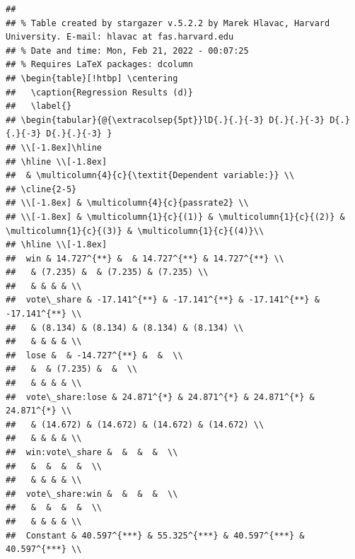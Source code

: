 \documentclass[
  12pt,
  landscape]{article}
\begin{document}
\begin{verbatim}
## 
## % Table created by stargazer v.5.2.2 by Marek Hlavac, Harvard University. E-mail: hlavac at fas.harvard.edu
## % Date and time: Mon, Feb 21, 2022 - 00:07:25
## % Requires LaTeX packages: dcolumn 
## \begin{table}[!htbp] \centering 
##   \caption{Regression Results (d)} 
##   \label{} 
## \begin{tabular}{@{\extracolsep{5pt}}lD{.}{.}{-3} D{.}{.}{-3} D{.}{.}{-3} D{.}{.}{-3} } 
## \\[-1.8ex]\hline 
## \hline \\[-1.8ex] 
##  & \multicolumn{4}{c}{\textit{Dependent variable:}} \\ 
## \cline{2-5} 
## \\[-1.8ex] & \multicolumn{4}{c}{passrate2} \\ 
## \\[-1.8ex] & \multicolumn{1}{c}{(1)} & \multicolumn{1}{c}{(2)} & \multicolumn{1}{c}{(3)} & \multicolumn{1}{c}{(4)}\\ 
## \hline \\[-1.8ex] 
##  win & 14.727^{**} &  & 14.727^{**} & 14.727^{**} \\ 
##   & (7.235) &  & (7.235) & (7.235) \\ 
##   & & & & \\ 
##  vote\_share & -17.141^{**} & -17.141^{**} & -17.141^{**} & -17.141^{**} \\ 
##   & (8.134) & (8.134) & (8.134) & (8.134) \\ 
##   & & & & \\ 
##  lose &  & -14.727^{**} &  &  \\ 
##   &  & (7.235) &  &  \\ 
##   & & & & \\ 
##  vote\_share:lose & 24.871^{*} & 24.871^{*} & 24.871^{*} & 24.871^{*} \\ 
##   & (14.672) & (14.672) & (14.672) & (14.672) \\ 
##   & & & & \\ 
##  win:vote\_share &  &  &  &  \\ 
##   &  &  &  &  \\ 
##   & & & & \\ 
##  vote\_share:win &  &  &  &  \\ 
##   &  &  &  &  \\ 
##   & & & & \\ 
##  Constant & 40.597^{***} & 55.325^{***} & 40.597^{***} & 40.597^{***} \\ 

\end{verbatim}
\end{document}
